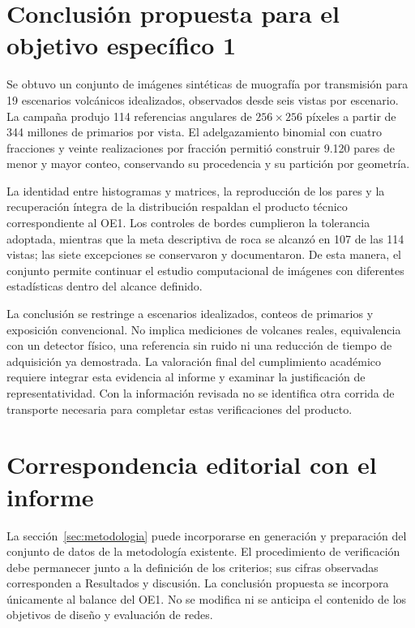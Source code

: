 \documentclass[11pt,a4paper]{article}
\begin{document}
\section{Conclusión propuesta para el objetivo específico 1}

Se obtuvo un conjunto de imágenes sintéticas de muografía por transmisión para 19 escenarios volcánicos idealizados, observados desde seis vistas por escenario. La campaña produjo 114 referencias angulares de $256\times256$ píxeles a partir de 344 millones de primarios por vista. El adelgazamiento binomial con cuatro fracciones y veinte realizaciones por fracción permitió construir 9.120 pares de menor y mayor conteo, conservando su procedencia y su partición por geometría.

La identidad entre histogramas y matrices, la reproducción de los pares y la recuperación íntegra de la distribución respaldan el producto técnico correspondiente al OE1. Los controles de bordes cumplieron la tolerancia adoptada, mientras que la meta descriptiva de roca se alcanzó en 107 de las 114 vistas; las siete excepciones se conservaron y documentaron. De esta manera, el conjunto permite continuar el estudio computacional de imágenes con diferentes estadísticas dentro del alcance definido.

La conclusión se restringe a escenarios idealizados, conteos de primarios y exposición convencional. No implica mediciones de volcanes reales, equivalencia con un detector físico, una referencia sin ruido ni una reducción de tiempo de adquisición ya demostrada. La valoración final del cumplimiento académico requiere integrar esta evidencia al informe y examinar la justificación de representatividad. Con la información revisada no se identifica otra corrida de transporte necesaria para completar estas verificaciones del producto.

\appendix
\section{Correspondencia editorial con el informe}

La sección~\ref{sec:metodologia} puede incorporarse en generación y preparación del conjunto de datos de la metodología existente. El procedimiento de verificación debe permanecer junto a la definición de los criterios; sus cifras observadas corresponden a Resultados y discusión. La conclusión propuesta se incorpora únicamente al balance del OE1. No se modifica ni se anticipa el contenido de los objetivos de diseño y evaluación de redes.
\end{document}
